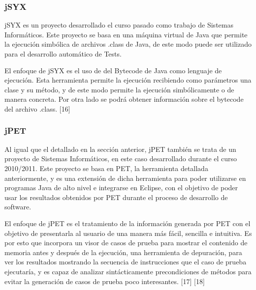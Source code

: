 \subsubsection{jSYX}

jSYX es un proyecto desarrollado el curso pasado como trabajo de Sistemas Inform\'aticos. Este proyecto se basa en una m\'aquina virtual de Java que permite la ejecuci\'on simb\'olica de archivos .class de Java, de este modo puede ser utilizado para el desarrollo autom\'atico de Tests. 

El enfoque de jSYX es el uso de del Bytecode de Java como lenguaje de ejecuci\'on. Esta herramienta permite la ejecuci\'on recibiendo como par\'ametros una clase y su m\'etodo, y de este modo permite la ejecuci\'on simb\'olicamente o de manera concreta. Por otra lado se podr\'a obtener informaci\'on sobre el bytecode del archivo .class. [16]

\subsubsection{jPET}

Al igual que el detallado en la secci\'on anterior, jPET tambi\'en se trata de un proyecto de Sistemas Inform\'aticos, en este caso desarrollado durante el curso 2010/2011. Este proyecto se basa en PET, la herramienta detallada anteriormente, y es una extensi\'on de dicha herramienta para poder utilizarse en programas Java de alto nivel e integrarse en Eclipse, con el objetivo de poder usar los resultados obtenidos por PET durante el proceso de desarrollo de software.

El enfoque de jPET es el tratamiento de la informaci\'on generada por PET con el objetivo de presentarla al usuario de una manera m\'as f\'acil, sencilla e intuitiva. Es por esto que incorpora un visor de casos de prueba para mostrar el contenido de memoria antes y despu\'es de la ejecuci\'on, una herramienta de depuraci\'on, para ver los resultados mostrando la secuencia de instrucciones que el caso de prueba ejecutar\'ia, y es capaz de analizar sint\'acticamente precondiciones de m\'etodos para evitar la generaci\'on de casos de prueba poco interesantes. [17] [18]


